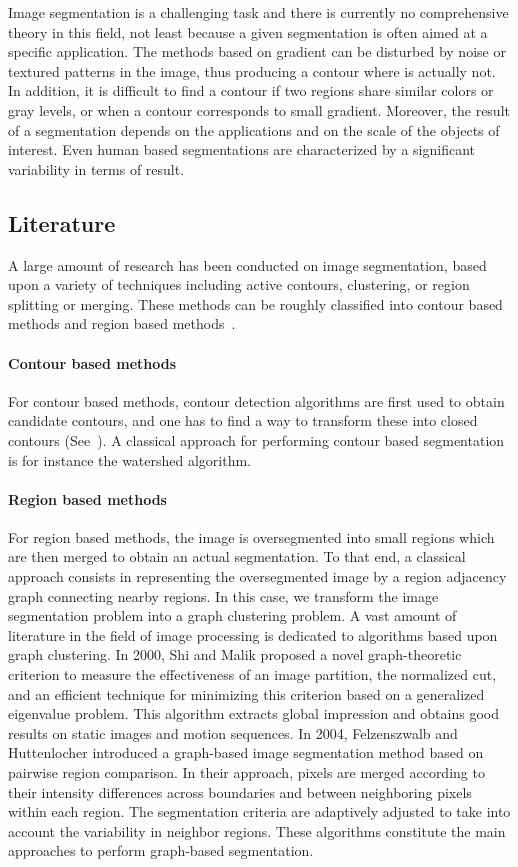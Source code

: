 \documentclass{article}
\begin{document}
        Image segmentation is a challenging task and there is currently no comprehensive theory in this field, not least because a given segmentation is often aimed at a specific application. The methods based on gradient can be disturbed by noise or textured patterns in the image, thus producing a contour where is actually not. In addition, it is difficult to find a contour if two regions share similar colors or gray levels, or when a contour corresponds to small gradient. Moreover, the result of a segmentation depends on the applications and on the scale of the objects of interest. Even human based segmentations are characterized by a significant variability in terms of result.

    \subsection{Literature}
        A large amount of research has been conducted on image segmentation, based upon a variety of techniques including active contours, clustering, or region splitting or merging. These methods can be roughly classified into contour based methods and region based methods~\cite{arbelaez2011}.
        \paragraph{Contour based methods} For contour based methods, contour detection algorithms are first used to obtain candidate contours, and one has to find a way to transform these into closed contours (See~\cite{ren2005, arbelaez2011}). A classical approach for performing contour based segmentation is for instance the watershed algorithm.
        \paragraph{Region based methods} For region based methods, the image is oversegmented into small regions which are then merged to obtain an actual segmentation. To that end, a classical approach consists in representing the oversegmented image by a region adjacency graph connecting nearby regions. In this case, we transform the image segmentation problem into a graph clustering problem. A vast amount of literature in the field of image processing is dedicated to algorithms based upon graph clustering. In 2000, Shi and Malik \cite{shi2000} proposed a novel graph-theoretic criterion to measure the effectiveness of an image partition, the normalized cut, and an efficient technique for minimizing this criterion based on a generalized eigenvalue problem. This algorithm extracts global impression and obtains good results on static images and motion sequences. In 2004, Felzenszwalb and Huttenlocher \cite{felzenszwalb2004} introduced a graph-based image segmentation method based on pairwise region comparison. In their approach, pixels are merged according to their intensity differences across boundaries and between neighboring pixels within each region. The segmentation criteria are adaptively adjusted to take into account the variability in neighbor regions. These algorithms constitute the main approaches to perform graph-based segmentation.
        \bigskip
\end{document}
